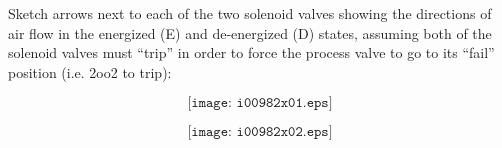 

Sketch arrows next to each of the two solenoid valves showing the directions of air flow in the energized (E) and de-energized (D) states, assuming both of the solenoid valves must ``trip'' in order to force the process valve to go to its ``fail'' position (i.e. 2oo2 to trip):

$$\texttt{[image: i00982x01.eps]}$$







$$\texttt{[image: i00982x02.eps]}$$
 











